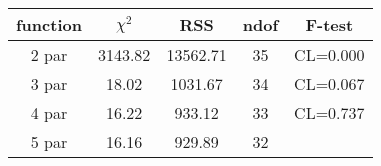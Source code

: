 \begin{tabular}{c|c|c|c|c}
function & $\chi^2$ & RSS & ndof & F-test \\
\hline
2 par & 3143.82 & 13562.71 & 35 & CL=0.000 \\
3 par & 18.02 & 1031.67 & 34 & CL=0.067 \\
4 par & 16.22 & 933.12 & 33 & CL=0.737 \\
5 par & 16.16 & 929.89 & 32 & \\
\hline
\end{tabular}
